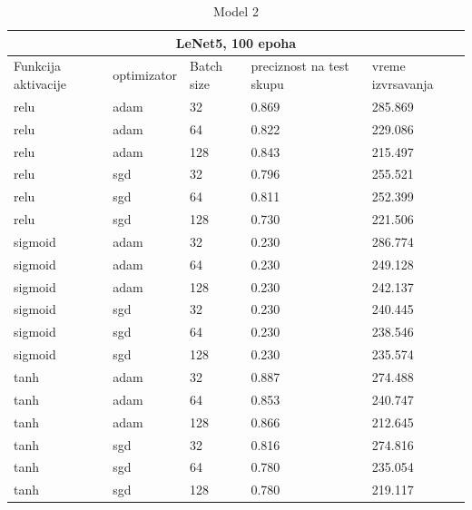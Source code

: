 \documentclass[a4paper]{article}
\begin{document}
\begin{table}[h!]
\begin{center}
\caption{Model 2}
\begin{tabular}{ |p{1.5cm}||p{2cm}|p{1cm}|p{1.5cm}|p{1.5cm}| }
 \hline
 \multicolumn{5}{|c|}{LeNet5, 100 epoha} \\
 \hline
 Funkcija aktivacije & optimizator & Batch size & preciznost na test skupu & vreme izvrsavanja\\
 \hline
 relu    & adam & 32  & 0.869  & 285.869  \\
 relu    & adam & 64  & 0.822  & 229.086  \\
 relu    & adam & 128 & 0.843  & 215.497  \\
 relu    & sgd  & 32  & 0.796  & 255.521  \\
 relu    & sgd  & 64  & 0.811  & 252.399  \\
 relu    & sgd  & 128 & 0.730  & 221.506  \\
 sigmoid & adam & 32  & 0.230  & 286.774  \\
 sigmoid & adam & 64  & 0.230  & 249.128  \\
 sigmoid & adam & 128 & 0.230  & 242.137  \\
 sigmoid & sgd  & 32  & 0.230  & 240.445  \\
 sigmoid & sgd  & 64  & 0.230  & 238.546  \\
 sigmoid & sgd  & 128 & 0.230  & 235.574  \\
 tanh    & adam & 32  & 0.887  & 274.488  \\
 tanh    & adam & 64  & 0.853  & 240.747  \\
 tanh    & adam & 128 & 0.866  & 212.645  \\
 tanh    & sgd  & 32  & 0.816  & 274.816  \\
 tanh    & sgd  & 64  & 0.780  & 235.054  \\
 tanh    & sgd  & 128 & 0.780  & 219.117  \\

 \hline
\end{tabular}
\label{tabela_model2_2}
\end{center}
\end{table}
\end{document}
